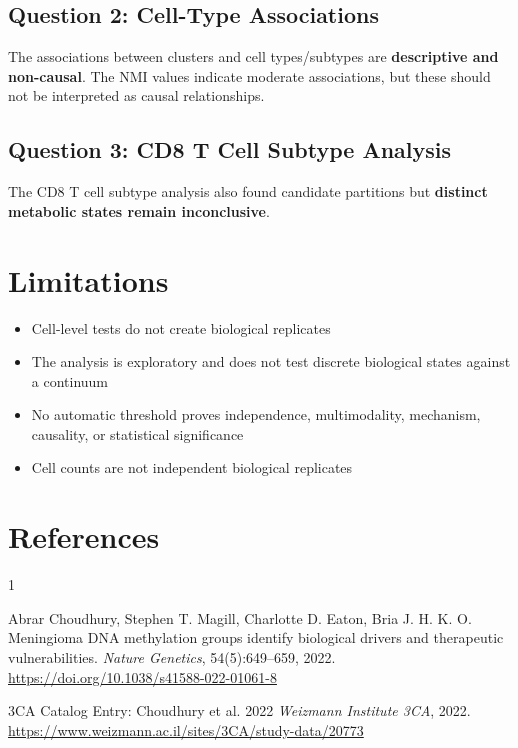 \documentclass[10pt]{article}
\begin{document}
\subsection{Question 2: Cell-Type Associations}

The associations between clusters and cell types/subtypes are \textbf{descriptive and non-causal}. The NMI values indicate moderate associations, but these should not be interpreted as causal relationships.

\subsection{Question 3: CD8 T Cell Subtype Analysis}

The CD8 T cell subtype analysis also found candidate partitions but \textbf{distinct metabolic states remain inconclusive}.

\section{Limitations}

\begin{itemize}
    \item Cell-level tests do not create biological replicates
    \item The analysis is exploratory and does not test discrete biological states against a continuum
    \item No automatic threshold proves independence, multimodality, mechanism, causality, or statistical significance
    \item Cell counts are not independent biological replicates
\end{itemize}

\section{References}

\begin{thebibliography}{1}

Abrar Choudhury, Stephen T. Magill, Charlotte D. Eaton, Bria J. H. K. O.
\newblock Meningioma DNA methylation groups identify biological drivers and therapeutic vulnerabilities.
\newblock \textit{Nature Genetics}, 54(5):649--659, 2022.
\newblock \url{https://doi.org/10.1038/s41588-022-01061-8}

3CA Catalog Entry: Choudhury et al. 2022
\newblock \textit{Weizmann Institute 3CA}, 2022.
\newblock \url{https://www.weizmann.ac.il/sites/3CA/study-data/20773}

\end{thebibliography}
\end{document}
